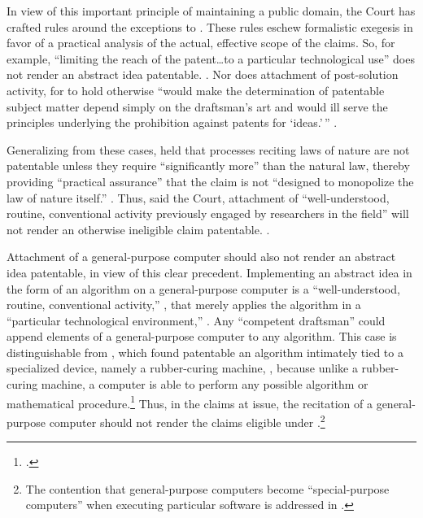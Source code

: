 \documentclass{scotus}
\begin{document}
In view of this important principle of maintaining a public domain, the Court
has crafted rules around the exceptions to . These rules eschew
formalistic exegesis in favor of a practical analysis of the actual, effective
scope of the claims.
So, for example,
``limiting the reach of the patent\ldots to a
particular technological use'' does not render an abstract idea patentable.
. Nor does attachment of
post-solution activity,
for to hold otherwise ``would make the determination of patentable
subject matter depend simply on the draftsman's art and would ill serve the
principles underlying the prohibition against patents for `ideas.'\,''
.

Generalizing from these cases,
 held that processes reciting laws of nature are not
patentable unless they require ``significantly more'' than the natural law,
thereby providing ``practical assurance'' that the claim is not ``designed to
monopolize the law of nature itself.''  . Thus, said the Court,
attachment of ``well-understood, routine, conventional activity previously
engaged by researchers in the field'' will not render an otherwise ineligible
claim patentable. .

Attachment of a general-purpose computer should also not render an abstract idea
patentable, in view of this clear precedent.
Implementing an
abstract idea in the form of an algorithm on a general-purpose computer is a
``well-understood, routine, conventional activity,'' , that
merely
applies the algorithm in a ``particular technological environment,''
.
Any ``competent draftsman'' could append elements of a
general-purpose computer to any algorithm.
This case is distinguishable from , which found patentable an
algorithm intimately tied to a specialized device, namely a rubber-curing
machine, , because unlike a rubber-curing machine, a
computer is able to perform any possible algorithm or mathematical
procedure.\footnote{.}
Thus, in the claims at issue, the recitation of a general-purpose computer
should not render the claims eligible under .\footnote{The
contention that general-purpose computers become ``special-purpose computers''
when executing particular software is addressed in .}
\end{document}
